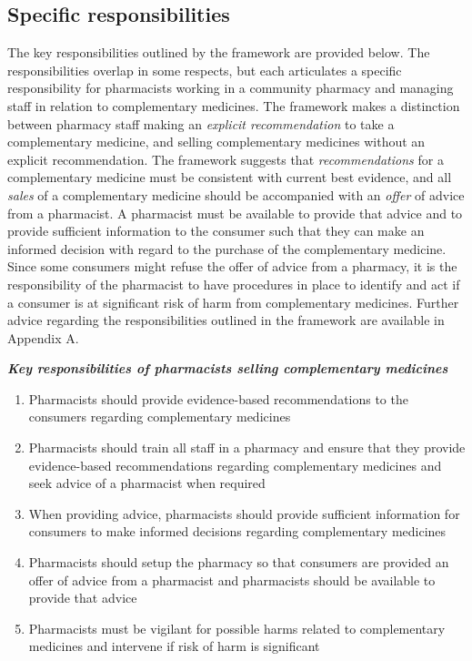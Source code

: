 \documentclass[12pt,]{article}
\providecommand{\tightlist}{%
  \setlength{\itemsep}{0pt}\setlength{\parskip}{0pt}}
\begin{document}
\subsection{Specific responsibilities}\label{specific-responsibilities}

The key responsibilities outlined by the framework are provided below.
The responsibilities overlap in some respects, but each articulates a
specific responsibility for pharmacists working in a community pharmacy
and managing staff in relation to complementary medicines. The framework
makes a distinction between pharmacy staff making an \emph{explicit
recommendation} to take a complementary medicine, and selling
complementary medicines without an explicit recommendation. The
framework suggests that \emph{recommendations} for a complementary
medicine must be consistent with current best evidence, and all
\emph{sales} of a complementary medicine should be accompanied with an
\emph{offer} of advice from a pharmacist. A pharmacist must be available
to provide that advice and to provide sufficient information to the
consumer such that they can make an informed decision with regard to the
purchase of the complementary medicine. Since some consumers might
refuse the offer of advice from a pharmacy, it is the responsibility of
the pharmacist to have procedures in place to identify and act if a
consumer is at significant risk of harm from complementary medicines.
Further advice regarding the responsibilities outlined in the framework
are available in Appendix A.

\textbf{\emph{Key responsibilities of pharmacists selling complementary
medicines}}

\begin{enumerate}
\def\labelenumi{\arabic{enumi}.}
\tightlist
\item
  Pharmacists should provide evidence-based recommendations to the
  consumers regarding complementary medicines
\item
  Pharmacists should train all staff in a pharmacy and ensure that they
  provide evidence-based recommendations regarding complementary
  medicines and seek advice of a pharmacist when required
\item
  When providing advice, pharmacists should provide sufficient
  information for consumers to make informed decisions regarding
  complementary medicines
\item
  Pharmacists should setup the pharmacy so that consumers are provided
  an offer of advice from a pharmacist and pharmacists should be
  available to provide that advice
\item
  Pharmacists must be vigilant for possible harms related to
  complementary medicines and intervene if risk of harm is significant
\end{enumerate}
\end{document}
